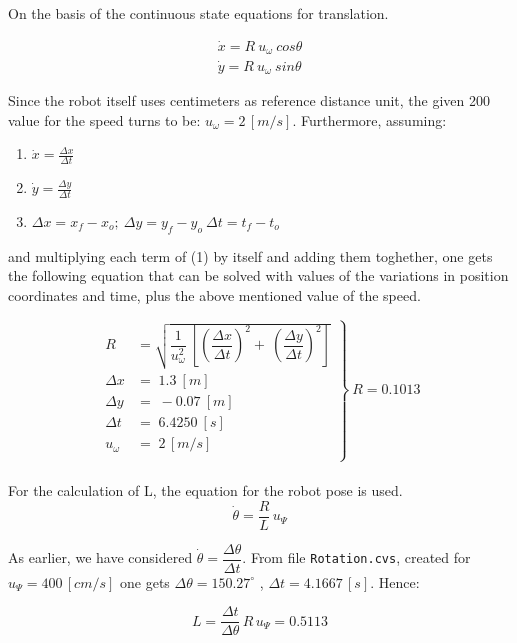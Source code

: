 On the basis of the continuous state equations for translation.

\begin{equation}
\begin{array}{ccc}
  \dot{x} = R\:u_{\omega}\:cos\theta \\

  \dot{y} = R\:u_{\omega}\:sin\theta
\end{array}
\end{equation}


Since the robot itself uses centimeters as reference distance unit, the  given
200 value for the speed turns to be: $u_{\omega} = 2\,[m/s]$. Furthermore,
assuming:

 \begin{enumerate}
 \item $ \dot{x} = \frac{\Delta x}{\Delta t}$
 \item $ \dot{y} = \frac{\Delta y}{\Delta t}$
 \item $\Delta x = x_{f} - x_{o};\ \Delta y = y_{f} - y_{o}\ \Delta t = t_{f} - t_{o}$
 \end{enumerate}

 and multiplying each term of (1) by itself and adding them toghether,
 one gets the following equation  that can be solved with values of the
 variations in position coordinates and time, plus the above mentioned value of
 the speed.

\begin{equation*}
 \left.
  \begin{array}{ll}
    R &= \sqrt{\dfrac{1}{u_{\omega}^{2}}\:\left[ \left( \dfrac{\Delta x}{\Delta t}\right)^2 + \:\left( \dfrac{\Delta y}{\Delta t}\right)^2 \right]} \\
    \Delta x &= \;1.3\:[m] \\
    \Delta y &=\;-0.07\:[m] \\
    \Delta t &=\;6.4250\:[s] \\
    u_{\omega} &=\;2\,[m/s] \\
\end{array}
\right\}\:R = 0.1013
 \end{equation*} \\

For the calculation of L, the equation for the robot pose is used.
$$\dot{\theta} = \dfrac{R}{L}\,u_{\Psi}$$

As earlier, we have considered $\dot{\theta} = \dfrac{\Delta \theta}{\Delta t}$.
From file \texttt{Rotation.cvs}, created for $u_{\Psi} = 400\,[cm/s]$ one gets
$\Delta\theta = 150.27^{\circ}$ , $\Delta t = 4.1667\,[s]$. Hence:

$$L = \dfrac{\Delta t}{\Delta \theta}\,R\,u_{\Psi} = 0.5113$$
